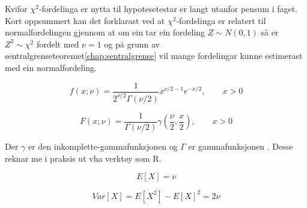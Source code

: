 Kvifor $\chi^2$-fordelinga er nytta til hypotesetestar er langt utanfor pensum i faget. Kort oppsummert kan det forklarast ved at $\chi^2$-fordelinga er relatert til normalfordelingen gjennom at om ein tar ein fordeling $Z \sim N(0,1)$ så er $Z^2 \sim \chi^2$ fordelt med $\nu = 1$ og på grunn av sentralgrenseteoremet\ref{chap:sentralgrense} vil mange fordelingar kunne estimerast med ein normalfordeling.

\begin{equation}
    f(x; \nu) = \frac{1}{2^{\nu/2}\Gamma(\nu/2)}x^{\nu/2 - 1}e^{-x/2}, \qquad x > 0
\end{equation}

\begin{equation}
    F(x; \nu) = \frac{1}{\Gamma(\nu / 2)} \gamma(\frac{\nu}{2}, \frac{x}{2}), \qquad x > 0
\end{equation}

Der $\gamma$ er den inkomplette-gammafunksjonen \cite{wiki:incomgamma} og $\Gamma$ er gammafunksjonen \cite{walpole2012probability}. Desse reknar me i praksis ut vha verktøy som R. 

\begin{equation}
    E[X] = \nu
\end{equation}

\begin{equation}
    Var[X] = E[X^2] - E[X]^2 = 2\nu
\end{equation}

